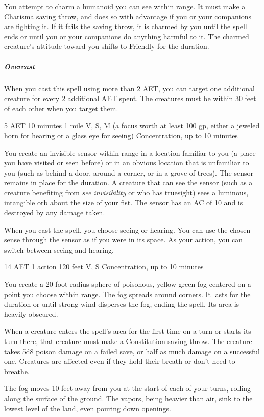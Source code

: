 You attempt to charm a humanoid you can see within range. It must make a Charisma saving throw, and does so with advantage if you or your companions are fighting it. If it fails the saving throw, it is charmed by you until the spell ends or until you or your companions do anything harmful to it. The charmed creature's attitude toward you shifts to Friendly for the duration.

\subparagraph*{Overcast} When you cast this spell using more than 2 AET, you can target one additional creature for every 2 additional AET spent. The creatures must be within 30 feet of each other when you target them.


{5 AET}
{10 minutes}
{1 mile}
{V, S, M (a focus worth at least 100 gp, either a jeweled horn for hearing or a glass eye for seeing)}
{Concentration, up to 10 minutes}

You create an invisible sensor within range in a location familiar to you (a place you have visited or seen before) or in an obvious location that is unfamiliar to you (such as behind a door, around a corner, or in a grove of trees). The sensor remains in place for the duration. A creature that can see the sensor (such as a creature benefiting from \textit{see invisibility} or who has truesight) sees a luminous, intangible orb about the size of your fist. The sensor has an AC of 10 and is destroyed by any damage taken.

When you cast the spell, you choose seeing or hearing. You can use the chosen sense through the sensor as if you were in its space. As your action, you can switch between seeing and hearing.


{14 AET}
{1 action}
{120 feet}
{V, S}
{Concentration, up to 10 minutes}

You create a 20-foot-radius sphere of poisonous, yellow-green fog centered on a point you choose within range. The fog spreads around corners. It lasts for the duration or until strong wind disperses the fog, ending the spell. Its area is heavily obscured.

When a creature enters the spell's area for the first time on a turn or starts its turn there, that creature must make a Constitution saving throw. The creature takes 5d8 poison damage on a failed save, or half as much damage on a successful one. Creatures are affected even if they hold their breath or don't need to breathe.

The fog moves 10 feet away from you at the start of each of your turns, rolling along the surface of the ground. The vapors, being heavier than air, sink to the lowest level of the land, even pouring down openings.

